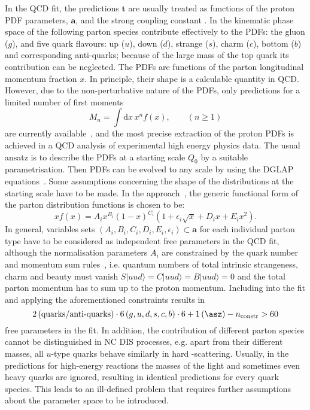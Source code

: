 In the QCD fit, the predictions $\mathbf{t}$ are usually treated as functions of the proton PDF parameters, $\mathbf{a}$, and the strong coupling constant \asz. In the kinematic phase space of \hera the following parton species contribute effectively to the PDFs: the gluon ($g$), and five quark flavours: up ($u$), down ($d$), strange ($s$), charm ($c$), bottom ($b$) and corresponding anti-quarks; because of the large mass of the top quark its contribution can be neglected. The PDFs are functions of the parton longitudinal momentum fraction $x$. In principle, their shape is a calculable quantity in QCD. However, due to the non-perturbative nature of the PDFs, only predictions for a limited number of first moments 
\begin{equation}
 M_n=\int\mathrm{d}x\,x^n f\left(x\right), \qquad (n\ge1)
\end{equation}
are currently available~\cite{Hagler:2009ni}, and the most precise extraction of the proton PDFs is achieved in a QCD analysis of experimental high energy physics data. The usual ansatz is to describe the PDFs at a starting scale $Q_0$ by a suitable parametrisation. Then PDFs can be evolved to any scale by using the DGLAP equations~\cite{Altarelli:1977zs,Gribov:1972,Dokshitzer:1977,Balitsky:1978}. Some assumptions concerning the shape of the distributions at the starting scale have to be made. In the \herapdf approach~\cite{Aaron:2009aa}, the generic functional form of the parton distribution functions is chosen to be:
\begin{equation}
 xf\left(x\right) = A_ix^{B_i}\left(1-x\right)^{C_i}\left(1+\epsilon_i\sqrt{x}+D_ix+E_ix^2\right).
 \label{eq:pdfansatz}
\end{equation}
In general, variables sets $\left(A_i,B_i,C_i,D_i,E_i,\epsilon_i\right)\subset\mathbf{a}$ for each individual parton type have to be considered as independent free parameters in the QCD fit, although the normalisation parameters $A_i$ are constrained by the quark number and momentum sum rules~\cite{Yndurain:2006lfa}, i.e. quantum numbers of total intrinsic strangeness, charm and beauty must vanish $S|uud\rangle=C|uud\rangle=B|uud\rangle=0$ and the total parton momentum has to sum up to the proton momentum. Including \asz into the fit and applying the aforementioned constraints results in 
\begin{equation}
2 \left( \text{quarks/anti-quarks}\right)\cdot 6\left(g,u,d,s,c,b\right)\cdot 6 + 1\left(\asz\right) - n_\text{constr} > 60
\end{equation}
free parameters in the fit. In addition, the contribution of different parton species cannot be distinguished in NC DIS processes, e.g. apart from their different masses, all $u$-type quarks behave similarly in hard \ep-scattering. Usually, in the predictions for high-energy reactions the masses of the light and sometimes even heavy quarks are ignored, resulting in identical predictions for every quark species. This leads to an ill-defined problem that requires further assumptions about the parameter space to be introduced. 

